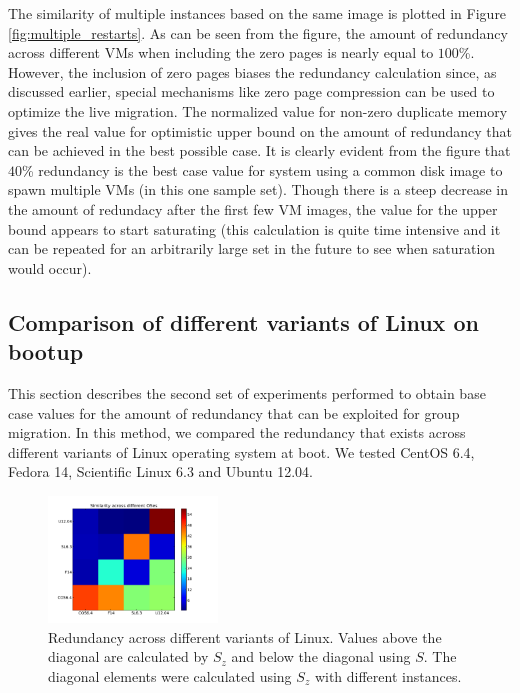\documentclass{acm_proc_article-sp}
\begin{document}
The similarity of multiple instances based on the same image is plotted in Figure \ref{fig:multiple_restarts}.  As can be seen from the figure, the amount of redundancy across different VMs when including the zero pages is nearly equal to $100$\%. However, the inclusion of zero pages biases the redundancy calculation since, as discussed earlier, special mechanisms like zero page compression can be used to optimize the live migration. The normalized value for non-zero duplicate memory gives the real value for optimistic upper bound on the amount of redundancy that can be achieved in the best possible case. It is clearly evident from the figure that $40$\% redundancy is the best case value for system using a common disk image to spawn multiple VMs (in this one sample set). Though there is a steep decrease in the amount of redundacy after the first few VM images, the value for the upper bound appears to start saturating (this calculation is quite time intensive and it can be repeated for an arbitrarily large set in the future to see when saturation would occur).


\subsection{Comparison of different variants of Linux on bootup}
This section describes the second set of experiments performed to obtain base case values for the amount of redundancy that can be exploited for group migration. In this method, we compared the redundancy that exists across different variants of Linux operating system at boot. We tested CentOS 6.4, Fedora 14, Scientific Linux 6.3 and Ubuntu 12.04.

\begin{figure}
  \centering
  \includegraphics[width=0.4\textwidth]{images/diff-var.pdf}
  \caption{Redundancy across different variants of Linux.  Values above the diagonal are calculated by $S_z$ and below the diagonal using $S$. The diagonal elements were calculated using $S_z$ with different instances.}\label{fig:diff_var}
\end{figure}
\end{document}
